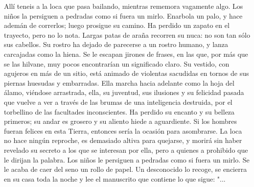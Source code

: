 \documentclass[11pt]{article}
\begin{document}
{\huge
Allí teneis a la loca que pasa bailando, mientras rememora vagamente algo. Los niños la persiguen a pedradas como si fuera un mirlo. Enarbola un palo, y hace ademán de correrlos; luego prosigue su camino. Ha perdido un zapato en el trayecto, pero no lo nota. Largas patas de araña recorren su nuca: no son tan sólo sus cabellos. Su rostro ha dejado de parecerse a un rostro humano, y lanza carcajadas como la hiena. Se le escapan jirones de frases, en las que, por más que se las hilvane, muy pocos encontrarían un significado claro. Su vestido, con agujeros en más de un sitio, está animado de violentas sacudidas en tornos de sus piernas huesudas y embarradas. Ella marcha hacia adelante como la hoja del álamo, viéndose arrastrada, ella, su juventud, sus ilusiones y su felicidad pasada que vuelve a ver a través de las brumas de una inteligencia destruida, por el torbellino de las facultades inconscientes. Ha perdido su encanto y su belleza primeros; su andar es grosero y su aliento hiede a aguardiente. Si los hombres fueran felices en esta Tierra, entonces sería la ocasión para asombrarse. La loca no hace ningún reproche, es demasiado altiva para quejarse, y morirá sin haber revelado su secreto a los que se interesan por ella, pero a quienes a prohibido que le dirijan la palabra. Los niños le persiguen a pedradas como si fuera un mirlo. Se le acaba de caer del seno un rollo de papel. Un desconocido lo recoge, se encierra en su casa toda la noche y lee el manuscrito que contiene lo que sigue: "...

}
\end{document}
